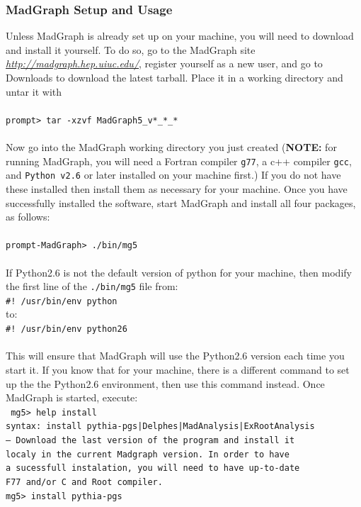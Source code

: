 \documentclass[12pt]{article}
\begin{document}
\subsubsection{MadGraph Setup and Usage}
Unless MadGraph is already set up on your machine, you will need to download and install it yourself.  To do so, go to the MadGraph site \href{http://madgraph.hep.uiuc.edu/}{\textit{http://madgraph.hep.uiuc.edu/}}, register yourself as a new user, and go to Downloads to download the latest tarball.  Place it in a working directory and untar it with \\ 
\\
\texttt{prompt> tar -xzvf MadGraph5\_v*\_*\_*}\\ 
\\
Now go into the MadGraph working directory you just created (\textbf{NOTE:} for running MadGraph, you will need a Fortran compiler \texttt{g77}, a c++ compiler \texttt{gcc}, and \texttt{Python v2.6} or later installed on your machine first.)  If you do not have these installed then install them as necessary for your machine.  
Once you have successfully installed the software, start MadGraph and install all four packages, as follows: \\ 
\\
\texttt{prompt-MadGraph> ./bin/mg5}\\
\\
If Python2.6 is not the default version of python for your machine, then modify the first line of the \texttt{./bin/mg5} file from:\\
\texttt{\#! /usr/bin/env python}\\
to:\\
\texttt{\#! /usr/bin/env python26}\\
\\
This will ensure that MadGraph will use the Python2.6 version each time you start it.  If you know that for your machine, there is a different command to set up the the Python2.6 environment, then use this command instead.  Once MadGraph is started, execute:\\
\texttt{
\hspace*{0.0cm}mg5> help install\\
\hspace*{0.0cm}syntax: install pythia-pgs|Delphes|MadAnalysis|ExRootAnalysis\\
\hspace*{0.0cm}-- Download the last version of the program and install it\\
\hspace*{0.4cm}   localy in the current Madgraph version. In order to have\\
\hspace*{0.4cm}   a sucessfull instalation, you will need to have up-to-date\\
\hspace*{0.4cm}   F77 and/or C and Root compiler.\\
\hspace*{0.0cm}mg5> install pythia-pgs\\
} 
\end{document}
